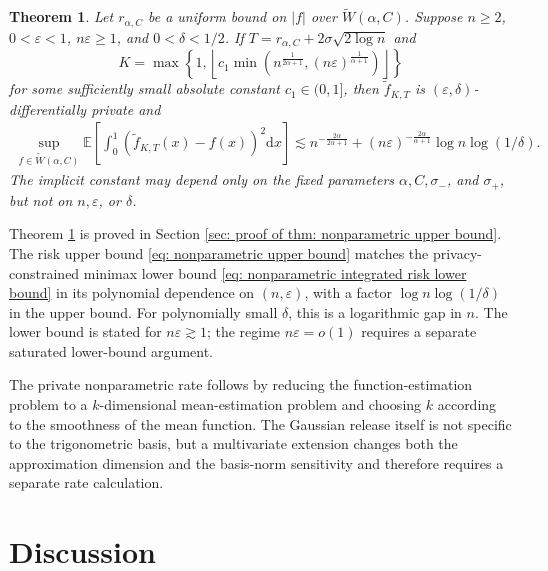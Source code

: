 \documentclass[letterpaper,12pt]{article}
\renewcommand{\d}{\mathrm{d}}
\numberwithin{equation}{section}
\theoremstyle{plain}
\newtheorem{Theorem}{Theorem}
\numberwithin{Theorem}{section}
\numberwithin{proposition}{section}
\numberwithin{Lemma}{section}
{
	\theoremstyle{definition}
	\newtheorem{Definition}{Definition}
	\newtheorem{example}{Example}
	\numberwithin{example}{section}
	\newtheorem{fact}{Fact}
	\numberwithin{fact}{section}
	\newtheorem{remark}{Remark}
}
\newcommand{\rev}[1]{#1}
\newcommand{\furtherrev}[1]{#1}
\newcommand{\1}{\mathbbm{1}}
\def\E{\mathbb{E}}
\begin{document}
	\begin{Theorem} \label{thm: nonparametric upper bound}
			\rev{Let $r_{\alpha,C}$ be a uniform bound on $|f|$ over $\tilde W(\alpha,C)$. Suppose $n\geq2$, $0<\varepsilon<1$, $n\varepsilon\geq1$, and $0<\delta<1/2$. If $T=r_{\alpha,C}+2\sigma\sqrt{2\log n}$ and
		\[
		K=\max\left\{1,\left\lfloor c_1\min\left(n^{\frac{1}{2\alpha+1}},(n\varepsilon)^{\frac{1}{\alpha+1}}\right)\right\rfloor\right\}
		\]
		for some sufficiently small absolute constant $c_1\in(0,1]$, then $\tilde f_{K,T}$ is $(\varepsilon,\delta)$-differentially private and}
		\begin{align}\label{eq: nonparametric upper bound}
		\sup_{f \in \tilde W(\alpha, C)}\E \left[ \int_0^1 (\tilde f_{K, T}(x) - f(x))^2 \d x \right] \lesssim n^{-\frac{2\alpha}{2\alpha+1}} + \rev{(n\varepsilon)^{-\frac{2\alpha}{\alpha+1}} \log n\log(1/\delta)}.
	\end{align}
	\furtherrev{The implicit constant may depend only on the fixed parameters $\alpha,C,\sigma_-$, and $\sigma_+$, but not on $n,\varepsilon$, or $\delta$.}
\end{Theorem}
	Theorem \ref{thm: nonparametric upper bound} is proved in Section \ref{sec: proof of thm: nonparametric upper bound}. The risk upper bound \eqref{eq: nonparametric upper bound} matches the privacy-constrained minimax lower bound \eqref{eq: nonparametric integrated risk lower bound} \rev{in its polynomial dependence on $(n,\varepsilon)$, with a factor $\log n\log(1/\delta)$ in the upper bound. For polynomially small $\delta$, this is a logarithmic gap in $n$.} \rev{The lower bound is stated for $n\varepsilon\gtrsim1$; the regime $n\varepsilon=o(1)$ requires a separate saturated lower-bound argument.}
	
	The private \furtherrev{nonparametric} rate follows by reducing the function-estimation problem to a $k$-dimensional mean-estimation problem and choosing $k$ according to the smoothness of the mean function. \rev{The Gaussian release itself is not specific to the trigonometric basis, but a multivariate extension changes both the approximation dimension and the basis-norm sensitivity and therefore requires a separate rate calculation.}


\section{Discussion}\label{sec: discussion}
\end{document}
